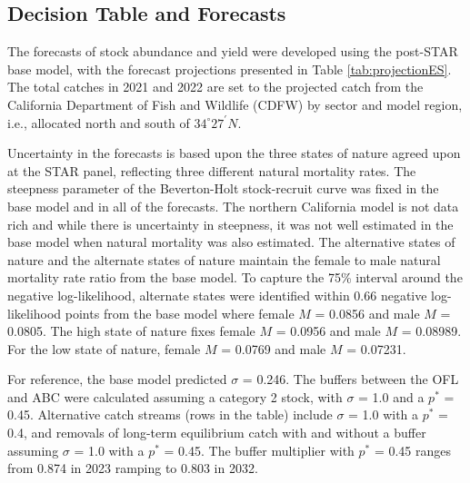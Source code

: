 \documentclass[
  english,
  a4paper,
]{article}
\begin{document}
\FloatBarrier

\hypertarget{decision-table-and-forecasts}{%
\subsection*{Decision Table and Forecasts}\label{decision-table-and-forecasts}}

The forecasts of stock abundance and yield were developed using the post-STAR
base model, with the forecast projections presented in
Table \ref{tab:projectionES}. The total catches in 2021 and 2022 are set to
the projected catch from the California Department of Fish and Wildlife (CDFW) by
sector and model region, i.e., allocated north and south of $34^\circ 27^\prime N$.

Uncertainty in the forecasts is based upon the three states of nature agreed upon
at the STAR panel, reflecting three different natural mortality rates. The steepness
parameter of the Beverton-Holt stock-recruit curve was fixed in the base model
and in all of the forecasts. The northern California model is not data rich and
while there is uncertainty in steepness, it was not well estimated in the base
model when natural mortality was also estimated. The alternative states of nature
and the alternate states of nature maintain the
female to male natural mortality rate ratio from the base model. To capture the
75\% interval around the negative log-likelihood, alternate states were identified
within 0.66 negative log-likelihood points from the base model where female
\(M\) = 0.0856 and male \(M\) = 0.0805.
The high state of nature fixes female \(M\) = 0.0956 and male \(M\) = 0.08989.
For the low state of nature, female \(M\) = 0.0769 and male \(M\) = 0.07231.

For reference, the base model predicted \(\sigma\) = 0.246. The buffers between the OFL and ABC were calculated assuming a category 2 stock, with \(\sigma\) = 1.0
and a \(p^*\) = 0.45. Alternative catch streams (rows in the table) include \(\sigma\) = 1.0
with a \(p^*\) = 0.4, and removals of long-term equilibrium catch with and without a buffer assuming \(\sigma\) = 1.0 with a \(p^*\) = 0.45. The buffer multiplier with \(p^*\) = 0.45 ranges from 0.874 in 2023 ramping to 0.803 in 2032.
\end{document}
